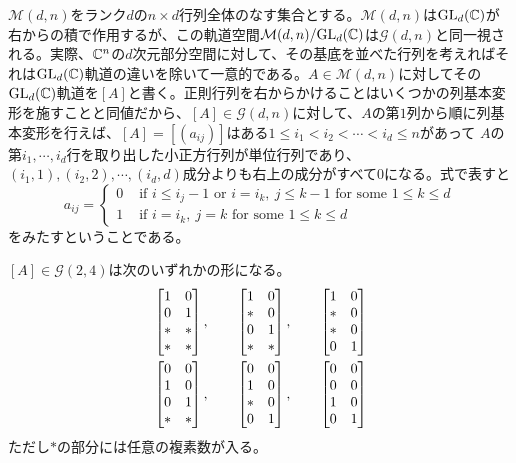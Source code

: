 \documentclass{ltjsreport}
\begin{document}
$\mathcal{M}(d,n)$をランク$d$の$n\times d$行列全体のなす集合とする。$\mathcal{M}(d,n)$は$\text{GL}_d(\mathbb{C})$が右からの積で作用するが、この軌道空間$\mathcal{M}(d,n)/\text{GL}_d(\mathbb{C})$は$\mathcal{G}(d,n)$と同一視される。実際、$\mathbb{C}^n$の$d$次元部分空間に対して、その基底を並べた行列を考えればそれは$\text{GL}_d(\mathbb{C})$軌道の違いを除いて一意的である。$A\in\mathcal{M}(d,n)$に対してその$\text{GL}_d(\mathbb{C})$軌道を$[A]$と書く。正則行列を右からかけることはいくつかの列基本変形を施すことと同値だから、$[A]\in\mathcal{G}(d,n)$に対して、$A$の第$1$列から順に列基本変形を行えば、$[A]=[(a_{ij})]$はある$1\leq i_1<i_2<\cdots<i_d\leq n$があって
$A$の第$i_1,\cdots,i_d$行を取り出した小正方行列が単位行列であり、$(i_1,1),(i_2,2),\cdots,(i_d,d)$成分よりも右上の成分がすべて$0$になる。式で表すと
\begin{equation}\label{schubertcell}
a_{ij}=\left\{\begin{array}{cl}
  0 & \text{ if } i \leq i_{j}-1 \text{ or } i=i_k,\: j\leq k-1 \text{ for some $1\leq k\leq d$}\\
  1 & \text{ if } i = i_k,\: j = k \text{ for some $1\leq k\leq d$}
\end{array}\right.  
\end{equation}
をみたすということである。

\begin{eg}
  $[A]\in\mathcal{G}(2,4)$は次のいずれかの形になる。
  \begin{align*}
    &\begin{bmatrix} 
      1 & 0\\
      0 & 1\\
      * & *\\
      * & *
     \end{bmatrix},\qquad 
    \begin{bmatrix} 
      1 & 0\\
      * & 0\\
      0 & 1\\
      * & *
     \end{bmatrix},\qquad
    \begin{bmatrix} 
      1 & 0\\
      * & 0\\
      * & 0\\
      0 & 1
     \end{bmatrix}\\
    &\begin{bmatrix} 
      0 & 0\\
      1 & 0\\
      0 & 1\\
      * & *
     \end{bmatrix},\qquad
    \begin{bmatrix} 
      0 & 0\\
      1 & 0\\
      * & 0\\
      0 & 1
     \end{bmatrix},\qquad
    \begin{bmatrix} 
      0 & 0\\
      0 & 0\\
      1 & 0\\
      0 & 1
     \end{bmatrix}
  \end{align*}
  ただし$*$の部分には任意の複素数が入る。
\end{eg}
\end{document}
